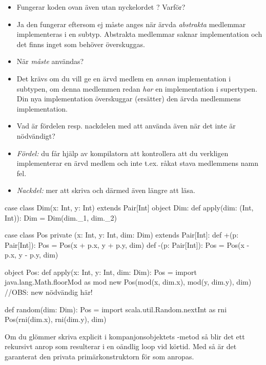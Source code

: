\SubtaskSolved 
\begin{itemize}
  \item Fungerar koden ovan även utan nyckelordet ? Varför? 
  \item[] Ja den fungerar eftersom  ej måste anges när ärvda \emph{abstrakta} medlemmar implementeras i en subtyp. Abstrakta medlemmar saknar implementation och det finns inget som behöver överskuggas. 
  \item När \emph{måste}  användas? 
  \item[] Det krävs  om du vill ge en ärvd medlem en \emph{annan} implementation i subtypen, om denna medlemmen redan \emph{har} en implementation i supertypen. Din nya implementation överskuggar (ersätter) den ärvda medlemmens implementation. 
  \item Vad är fördelen resp. nackdelen med att använda  även när det inte är nödvändigt?
  \item[] \emph{Fördel:} du får hjälp av kompilatorn att kontrollera att du verkligen implementerar en ärvd medlem och inte t.ex. råkat stava medlemmens namn fel.
  \item[] \emph{Nackdel:} mer att skriva och därmed även längre att läsa.
\end{itemize}

\SubtaskSolved
\begin{CodeSmall}
case class Dim(x: Int, y: Int) extends Pair[Int]
object Dim:
  def apply(dim: (Int, Int)): Dim = Dim(dim._1, dim._2)  
\end{CodeSmall}

\SubtaskSolved
\begin{CodeSmall}
case class Pos private (x: Int, y: Int, dim: Dim) extends Pair[Int]:
  def +(p: Pair[Int]): Pos = Pos(x + p.x, y + p.y, dim)
  def -(p: Pair[Int]): Pos = Pos(x - p.x, y - p.y, dim)

object Pos:
  def apply(x: Int, y: Int, dim: Dim): Pos = 
    import java.lang.Math.floorMod as mod
    new Pos(mod(x, dim.x), mod(y, dim.y), dim) //OBS: new nödvändig här!

  def random(dim: Dim): Pos = 
    import scala.util.Random.nextInt as rni
    Pos(rni(dim.x), rni(dim.y), dim)
\end{CodeSmall}

\SubtaskSolved Om du glömmer skriva  explicit i kompanjonsobjektets -metod så blir det ett rekursivt anrop som resulterar i en oändlig loop vid körtid. Med  så är det garanterat den privata primärkonstruktorn för  som anropas. 

